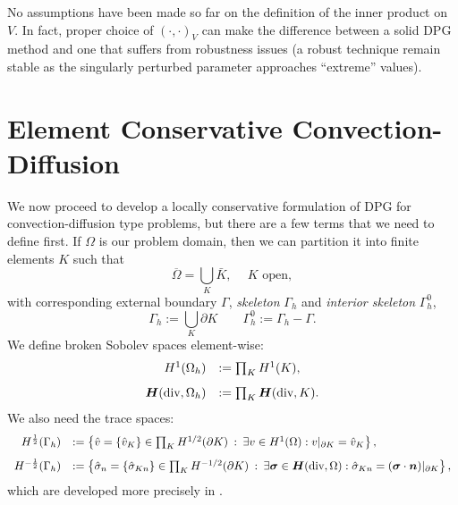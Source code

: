 \documentclass[letterpaper]{article}
\newcommand{\LRp}[1]{\left( #1 \right)}
\newcommand{\ptl}{{\partial}}
\newcommand{\bfsig}{\mbox{\boldmath $\sigma$}}
\newcommand{\bfn}{\mbox{\boldmath $n$}}
\newcommand{\bfH}{\mbox{\boldmath $H$}}
\begin{document}
No assumptions have been made so far on the definition of the inner product on
$V$. In fact, proper choice of $\LRp{\cdot,\cdot}_V$ can make the difference
between a solid DPG method and one that suffers from robustness issues 
(a robust technique remain stable as the singularly perturbed parameter approaches ``extreme'' values).

\section{Element Conservative Convection-Diffusion}
We now proceed to develop a locally conservative formulation of DPG for
convection-diffusion type problems, but there are a few terms that we need to
define first. If $\Omega$ is our problem domain, then we can partition it into
finite elements $K$ such that
\[
\overline{\Omega} = \bigcup_K  \bar{K},\: \quad K \text { open},
\]
with corresponding external boundary $\Gamma$, {\em skeleton} $\Gamma_h$ and {\em interior
  skeleton} $\Gamma_h^0$,
\[
\Gamma_h := \bigcup_K \partial K\qquad \Gamma_h^0 := \Gamma_h - \Gamma.
\]
We define broken Sobolev spaces element-wise:
\[
\begin{array}{rl}
H^1(\Omega_h) & := \prod_K H^1(K), \\[8pt]
\bfH(\text{div},\Omega_h) & := \prod_K \bfH(\text{div},K).
\end{array}
\]
We also need the trace spaces:
\[
\begin{array}{rl}
H^\frac{1}{2}(\Gamma_h) & := \left\{ \hat{v} = \{\hat{v}_K \} \in \prod_K H^{1/2}(\ptl K) \: :
\: \exists v \in H^1(\Omega) : v|_{\ptl K} = \hat{v}_K \right\}, \\[8pt]
H^{-\frac{1}{2}}(\Gamma_h) & := \left\{ {\hat{\sigma}}_n = \{ {\hat{\sigma}}_{Kn} \}\in \prod_K H^{-1/2}(\ptl K) \: : \: \exists \bfsig \in \bfH(\text{div},\Omega)
: {\hat{\sigma}}_{Kn} = (\bfsig \cdot \bfn)|_{\ptl K} \right\},
\end{array}
\]
which are developed more precisely in \cite{DPGStokes}.
\end{document}
